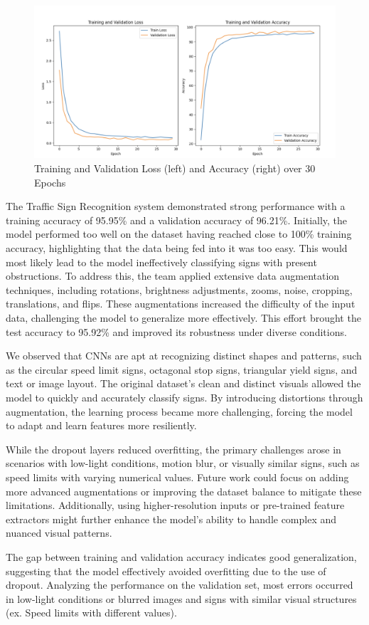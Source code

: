 \documentclass{article} %
\begin{document}
\begin{figure}[h]
    \centering
    \includegraphics[width=0.5\linewidth]{Validation and Training.png}
    \caption{Training and Validation Loss (left) and Accuracy (right) over 30 Epochs}
    \label{fig:enter-label}
\end{figure}

The Traffic Sign Recognition system demonstrated strong performance with a training accuracy of 95.95\% and a validation accuracy of 96.21\%. Initially, the model performed too well on the dataset having reached close to 100\% training accuracy, highlighting that the data being fed into it was too easy. This would most likely lead to the model ineffectively classifying signs with present obstructions. To address this, the team applied extensive data augmentation techniques, including rotations, brightness adjustments, zooms, noise, cropping, translations, and flips. These augmentations increased the difficulty of the input data, challenging the model to generalize more effectively. This effort brought the test accuracy to 95.92\% and improved its robustness under diverse conditions.

We observed that CNNs are apt at recognizing distinct shapes and patterns, such as the circular speed limit signs, octagonal stop signs, triangular yield signs, and text or image layout. The original dataset's clean and distinct visuals allowed the model to quickly and accurately classify signs. By introducing distortions through augmentation, the learning process became more challenging, forcing the model to adapt and learn features more resiliently.

While the dropout layers reduced overfitting, the primary challenges arose in scenarios with low-light conditions, motion blur, or visually similar signs, such as speed limits with varying numerical values. Future work could focus on adding more advanced augmentations or improving the dataset balance to mitigate these limitations. Additionally, using higher-resolution inputs or pre-trained feature extractors might further enhance the model's ability to handle complex and nuanced visual patterns.

The gap between training and validation accuracy indicates good generalization, suggesting that the model effectively avoided overfitting due to the use of dropout. Analyzing the performance on the validation set, most errors occurred in low-light conditions or blurred images and signs with similar visual structures (ex. Speed limits with different values).  
\end{document}
